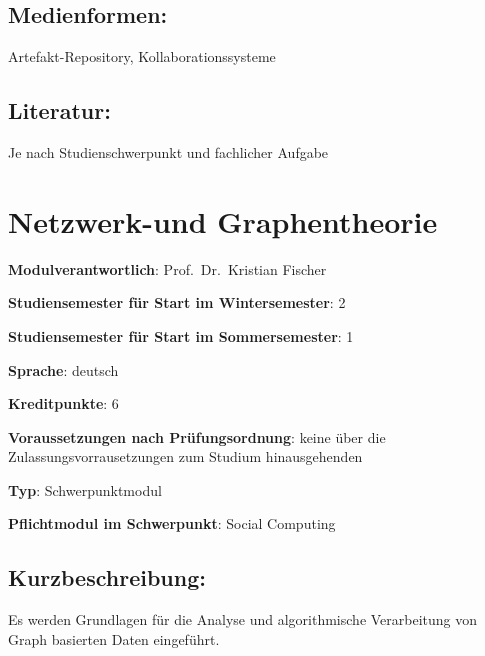 \section*{Medienformen:}\label{medienformen-10}

Artefakt-Repository, Kollaborationssysteme

\section*{Literatur:}\label{literatur-10}

Je nach Studienschwerpunkt und fachlicher Aufgabe

\chapter{Netzwerk-und Graphentheorie}\label{netzwerk-und-graphentheorie}

\begin{modulHead}
\textbf{Modulverantwortlich}: Prof.~Dr.~Kristian
Fischer
\end{modulHead}
\begin{modulHead}
\textbf{Studiensemester für
Start im Wintersemester}:
2
\end{modulHead}
\begin{modulHead}
\textbf{Studiensemester für Start
im Sommersemester}:
1
\end{modulHead}
\begin{modulHead}
\textbf{Sprache}:
deutsch
\end{modulHead}
\begin{modulHead}
\textbf{Kreditpunkte}:
6
\end{modulHead}
\begin{modulHead}
\textbf{Voraussetzungen nach
Prüfungsordnung}: keine über die Zulassungsvorrausetzungen zum Studium
hinausgehenden
\end{modulHead}
\begin{modulHead}
\textbf{Typ}:
Schwerpunktmodul
\end{modulHead}
\begin{modulHead}
\textbf{Pflichtmodul
im Schwerpunkt}: Social Computing
\end{modulHead}


\section*{Kurzbeschreibung:}\label{kurzbeschreibung-6}

Es werden Grundlagen für die Analyse und algorithmische Verarbeitung von
Graph basierten Daten eingeführt.


